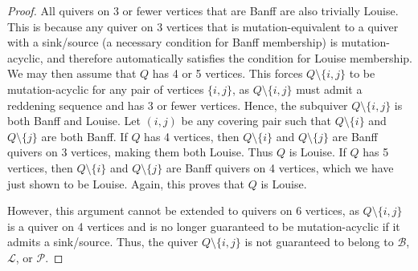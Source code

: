 \documentclass[ALCO,Unicode]{cedram}
\newcommand{\BB}{\mathcal{B}}
\newcommand{\PP}{\mathcal{P}}
\newcommand{\LL}{\mathcal{L}}
\begin{document}
\begin{proof}
    All quivers on 3 or fewer vertices that are Banff are also trivially Louise.
    This is because any quiver on 3 vertices that is mutation-equivalent to a quiver with a sink/source (a necessary condition for Banff membership) is mutation-acyclic, and therefore automatically satisfies the condition for Louise membership.
    We may then assume that $Q$ has 4 or 5 vertices.
    This forces $Q \setminus\{i,j\}$ to be mutation-acyclic for any pair of vertices $\{i,j\}$, as $Q \setminus\{i,j\}$ must admit a reddening sequence and has 3 or fewer vertices.
    Hence, the subquiver $Q \setminus \{i,j\}$ is both Banff and Louise. 
    Let $(i,j)$ be any covering pair such that $Q \setminus \{i\}$ and $Q \setminus \{j\}$ are both Banff.
    If $Q$ has 4 vertices, then $Q \setminus \{i\}$ and $Q \setminus \{j\}$ are Banff quivers on 3 vertices, making them both Louise. 
    Thus $Q$ is Louise.
    If $Q$ has 5 vertices, then $Q \setminus \{i\}$ and $Q \setminus \{j\}$ are Banff quivers on 4 vertices, which we have just shown to be Louise.
    Again, this proves that $Q$ is Louise.
    
    However, this argument cannot be extended to quivers on 6 vertices, as $Q \setminus \{i,j\}$ is a quiver on 4 vertices and is no longer guaranteed to be mutation-acyclic if it admits a sink/source.
    Thus, the quiver $Q \setminus \{i,j\}$ is not guaranteed to belong to $\BB$, $\LL$, or $\PP$.
\end{proof}




\end{document}
